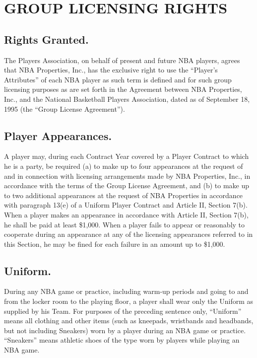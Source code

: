 \documentclass[
]{book}
\begin{document}
\hypertarget{group-licensing-rights}{%
\chapter{GROUP LICENSING RIGHTS}\label{group-licensing-rights}}

\hypertarget{rights-granted.}{%
\section{Rights Granted.}\label{rights-granted.}}

The Players Association, on behalf of present and future NBA players, agrees that NBA Properties, Inc., has the exclusive right to use the ``Player's Attributes'' of each NBA player as such term is defined and for such group licensing purposes as are set forth in the Agreement between NBA Properties, Inc., and the National Basketball Players Association, dated as of September 18, 1995 (the ``Group License Agreement'').

\hypertarget{player-appearances.}{%
\section{Player Appearances.}\label{player-appearances.}}

A player may, during each Contract Year covered by a Player Contract to which he is a party, be required (a) to make up to four appearances at the request of and in connection with licensing arrangements made by NBA Properties, Inc., in accordance with the terms of the Group License Agreement, and (b) to make up to two additional appearances at the request of NBA Properties in accordance with paragraph 13(e) of a Uniform Player Contract and Article II, Section 7(b). When a player makes an appearance in accordance with Article II, Section 7(b), he shall be paid at least \$1,000. When a player fails to appear or reasonably to cooperate during an appearance at any of the licensing appearances referred to in this Section, he may be fined for each failure in an amount up to \$1,000.

\hypertarget{uniform.}{%
\section{Uniform.}\label{uniform.}}

During any NBA game or practice, including warm-up periods and going to and from the locker room to the playing floor, a player shall wear only the Uniform as supplied by his Team. For purposes of the preceding sentence only, ``Uniform'' means all clothing and other items (such as kneepads, wristbands and headbands, but not including Sneakers) worn by a player during an NBA game or practice. ``Sneakers'' means athletic shoes of the type worn by players while playing an NBA game.
\end{document}
